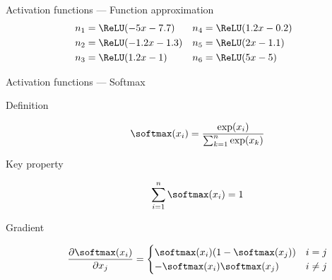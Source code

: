 \begin{frame}{Activation functions --- Function approximation}
  \centering
  {\small
    \begin{align*}
      n_1 & = \ReLU(-5x - 7.7) & n_4 & = \ReLU(1.2x - 0.2) \\
      n_2 & = \ReLU(-1.2x - 1.3) & n_5 & = \ReLU(2x - 1.1) \\
      n_3 & = \ReLU(1.2x - 1) & n_6 & = \ReLU(5x - 5) \\
    \end{align*}
  }
\end{frame}

\begin{frame}{Activation functions --- Softmax}
  \begin{description}
    \item[Definition] \[\softmax(x_i) = \frac{\exp(x_i)}{\sum_{k = 1}^n{\exp(x_k)}}\]
    \item[Key property] \[\sum_{i = 1}^n{\softmax(x_i)} = 1\]
    \item[Gradient] \[
      \frac{\partial \softmax(x_i)}{\partial x_j} =
        \begin{cases}
          \softmax(x_i)(1 - \softmax(x_j)) & i = j \\
          -\softmax(x_i)\softmax(x_j) & i \neq j
        \end{cases}
      \]
  \end{description}
  
\end{frame}
